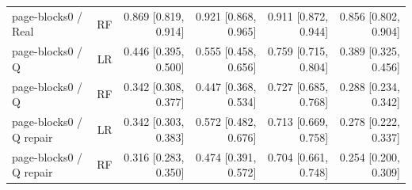 \begin{longtable}{lrrrrr}
page-blocks0 / Real & RF & 0.869 [0.819, 0.914] & 0.921 [0.868, 0.965] & 0.911 [0.872, 0.944] & 0.856 [0.802, 0.904] \\
page-blocks0 / Q & LR & 0.446 [0.395, 0.500] & 0.555 [0.458, 0.656] & 0.759 [0.715, 0.804] & 0.389 [0.325, 0.456] \\
page-blocks0 / Q & RF & 0.342 [0.308, 0.377] & 0.447 [0.368, 0.534] & 0.727 [0.685, 0.768] & 0.288 [0.234, 0.342] \\
page-blocks0 / Q repair & LR & 0.342 [0.303, 0.383] & 0.572 [0.482, 0.676] & 0.713 [0.669, 0.758] & 0.278 [0.222, 0.337] \\
page-blocks0 / Q repair & RF & 0.316 [0.283, 0.350] & 0.474 [0.391, 0.572] & 0.704 [0.661, 0.748] & 0.254 [0.200, 0.309] \\
\bottomrule\end{longtable}
